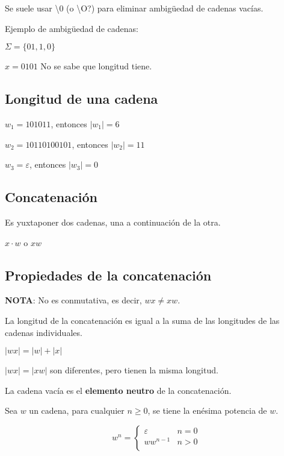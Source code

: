 \documentclass{article}
\begin{document}
Se suele usar \textbackslash 0 (o \textbackslash O?) para eliminar ambigüedad de cadenas vacías.
\vspace{1em}

Ejemplo de ambigüedad de cadenas:
\vspace{1em}

$\Sigma = \{01, 1, 0\}$

$x = 0101$ No se sabe que longitud tiene.

\subsection{Longitud de una cadena}

$w_1 = 101011$, entonces $|w_1| = 6$

$w_2 = 10110100101$, entonces $|w_2| = 11$

$w_3 = \varepsilon$, entonces $|w_3| = 0$

\subsection{Concatenación}

Es yuxtaponer dos cadenas, una a continuación de la otra.

$x \cdot w$ o $xw$

\subsection{Propiedades de la concatenación}

\textbf{NOTA}: No es conmutativa, es decir, $wx \ne xw$.
\vspace{1em}

La longitud de la concatenación es igual a la suma de las longitudes de las
cadenas individuales.
\vspace{1em}

$|wx| = |w| + |x|$

$|wx| = |xw|$ son diferentes, pero tienen la misma longitud.
\vspace{1em}

La cadena vacía es el \textbf{elemento neutro} de la concatenación.
\vspace{1em}

Sea $w$ un cadena, para cualquier $n \ge 0$, se tiene la enésima potencia
de $w$.

\begin{equation*}
    w^n = \begin{cases}
    \varepsilon & n = 0\\
    ww^{n-1} & n > 0\\
    \end{cases}
\end{equation*}
\end{document}

